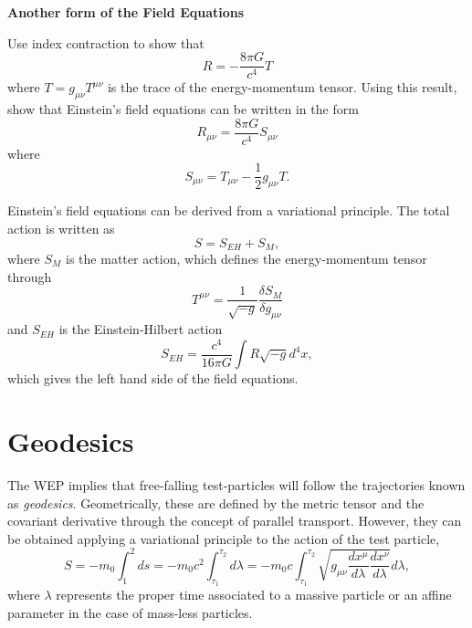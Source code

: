 \begin{exercise}
\textbf{Another form of the Field Equations}

Use index contraction to show that 
\begin{equation}
R = -\frac{8\pi G}{c^4} T
\end{equation}
where $T=g_{\mu \nu}T^{\mu \nu}$ is the trace of the energy-momentum tensor. Using this result, show that Einstein's field equations can be written in the form
\begin{equation}
R_{\mu \nu} = \frac{8\pi G}{c^4} S_{\mu \nu} \label{eq:EinsteinFieldEquations2}
\end{equation}
where 
\begin{equation}
S_{\mu \nu} = T_{\mu \nu} - \frac{1}{2} g_{\mu \nu} T .
\end{equation}
\end{exercise}

Einstein's field equations can be derived from a variational principle. The total action is written as
\begin{equation}
S = S_{EH} + S_M,
\end{equation}
where $S_M$ is the matter action, which defines the energy-momentum tensor through
\begin{equation}
T^{\mu \nu} = \frac{1}{\sqrt{-g}} \frac{\delta S_M}{\delta g_{\mu \nu}}
\end{equation}
 and $S_{EH}$ is the Einstein-Hilbert action
 \begin{equation}
 S_{EH} = \frac{c^4}{16 \pi G} \int R \sqrt{-g} d^4 x,
 \end{equation}
which gives the left hand side of the field equations.

\section{Geodesics}

The WEP implies that free-falling test-particles will follow the trajectories known as \textit{geodesics}. Geometrically, these are defined by the metric tensor and the covariant derivative through the concept of parallel transport. However, they can be obtained applying a variational principle to the action of the test particle,
\begin{equation}
S= -m_0  \int_1^2 ds = - m_0c^2 \int_{\tau_1}^{\tau_2} d\lambda =  -  m_0c \int_{\tau_1}^{\tau_2} \sqrt{g_{\mu \nu} \frac{dx^\mu}{d\lambda}\frac{dx^\nu}{d\lambda}} d\lambda, \label{eq:ActionSingleParticle}
\end{equation}
where $\lambda$ represents the proper time associated to a massive particle or an affine parameter in the case of mass-less particles. 

